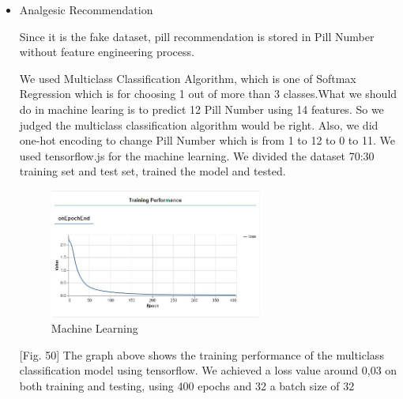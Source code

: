 \documentclass[conference]{IEEEtran}
\begin{document}
\begin{itemize}
\begin{enumerate}
\begin{enumerate}
\begin{itemize}
                \setlength{\parindent}{2ex} [Fig. 49] In the tensorflow, epoch is the number of training, batch size is the size of data at one training, and iteration is the number of traing batch at one epoch. Since our data set is limitied, one epoch is not enough. However, when the epoch is too much, there could be an overfitting. So we draw the graph to show the loss value in accordance with epoch and batch size. The loss value is 0.0018 on everage, so we judged that the prediction succeeded.
                  \item Analgesic Recommendation
                  
                 \setlength{\parindent}{2ex} Since it is the fake dataset, pill recommendation is stored in Pill Number without feature engineering process.
                 
                 \setlength{\parindent}{2ex} We used Multiclass Classification Algorithm, which is one of Softmax Regression which is for choosing 1 out of more than 3 classes.What we should do in machine learing is to predict 12 Pill Number using 14 features. So we judged the multiclass classification algorithm would be right. Also, we did one-hot encoding to change Pill Number which is from 1 to 12 to 0 to 11.  We used tensorflow.js for the machine learning. We divided the dataset 70:30 training set and test set, trained the model and tested.
                 \begin{figure}[ht]
                 \includegraphics[width=7cm, center]{machineclass4.png}
                 \caption{Machine Learning}
                 \label{fig50}
                 \end{figure}    
                 
                \setlength{\parindent}{2ex} [Fig. 50] The graph above shows the training performance of the multiclass classification model using tensorflow. We achieved a loss value around 0,03 on both training and testing, using 400 epochs and 32 a batch size of 32



            \end{itemize}

        \end{enumerate}
    \end{enumerate}
\end{itemize}
\end{document}
